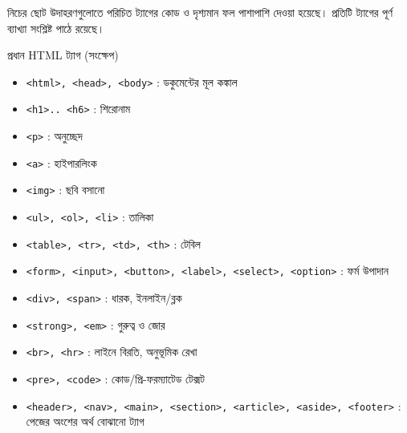 নিচের ছোট উদাহরণগুলোতে পরিচিত ট্যাগের কোড ও দৃশ্যমান ফল পাশাপাশি দেওয়া হয়েছে। প্রতিটি ট্যাগের পূর্ণ ব্যাখ্যা সংশ্লিষ্ট পাঠে রয়েছে।

\begin{keypointbox}{প্রধান HTML ট্যাগ (সংক্ষেপ)}
\begin{itemize}
\item \texttt{<html>, <head>, <body>} : ডকুমেন্টের মূল কঙ্কাল
\item \texttt{<h1>.. <h6>} : শিরোনাম
\item \texttt{<p>} : অনুচ্ছেদ
\item \texttt{<a>} : হাইপারলিংক
\item \texttt{<img>} : ছবি বসানো
\item \texttt{<ul>, <ol>, <li>} : তালিকা
\item \texttt{<table>, <tr>, <td>, <th>} : টেবিল
\item \texttt{<form>, <input>, <button>, <label>, <select>, <option>} : ফর্ম উপাদান
\item \texttt{<div>, <span>} : ধারক, ইনলাইন/ব্লক
\item \texttt{<strong>, <em>} : গুরুত্ব ও জোর
\item \texttt{<br>, <hr>} : লাইনে বিরতি, অনুভূমিক রেখা
\item \texttt{<pre>, <code>} : কোড/প্রি-ফরম্যাটেড টেক্সট
\item \texttt{<header>, <nav>, <main>, <section>, <article>, <aside>, <footer>} : পেজের অংশের অর্থ বোঝানো ট্যাগ
\end{itemize}
\end{keypointbox}

